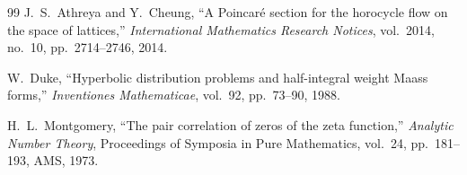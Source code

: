 \documentclass[11pt]{article}
\theoremstyle{definition}
\begin{document}
\begin{thebibliography}{99}
J.~S.~Athreya and Y.~Cheung,
``A Poincar\'e section for the horocycle flow on the space of
lattices,''
\emph{International Mathematics Research Notices},
vol.~2014, no.~10, pp.~2714--2746, 2014.

W.~Duke,
``Hyperbolic distribution problems and half-integral weight Maass forms,''
\emph{Inventiones Mathematicae}, vol.~92, pp.~73--90, 1988.

H.~L.~Montgomery,
``The pair correlation of zeros of the zeta function,''
\emph{Analytic Number Theory}, Proceedings of Symposia in Pure
Mathematics, vol.~24, pp.~181--193, AMS, 1973.

\end{thebibliography}
\end{document}
